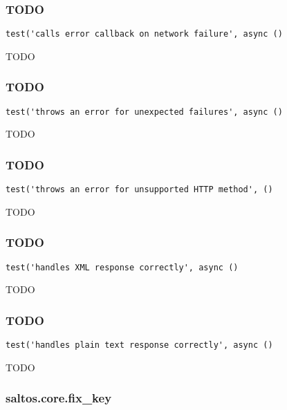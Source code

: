 \documentclass[a4paper]{article}
\begin{document}
\hypertarget{toc515}{}
\subsubsection{TODO}

\begin{lstlisting}
test('calls error callback on network failure', async ()
\end{lstlisting}

TODO

\hypertarget{toc516}{}
\subsubsection{TODO}

\begin{lstlisting}
test('throws an error for unexpected failures', async ()
\end{lstlisting}

TODO

\hypertarget{toc517}{}
\subsubsection{TODO}

\begin{lstlisting}
test('throws an error for unsupported HTTP method', ()
\end{lstlisting}

TODO

\hypertarget{toc518}{}
\subsubsection{TODO}

\begin{lstlisting}
test('handles XML response correctly', async ()
\end{lstlisting}

TODO

\hypertarget{toc519}{}
\subsubsection{TODO}

\begin{lstlisting}
test('handles plain text response correctly', async ()
\end{lstlisting}

TODO

\hypertarget{toc520}{}
\subsubsection{saltos.core.fix\_key}
\end{document}
